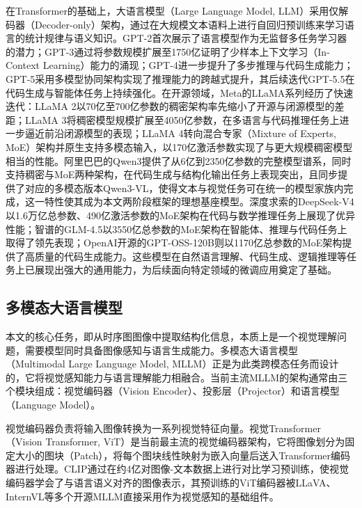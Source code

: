 在Transformer的基础上，大语言模型（Large Language Model, LLM）采用仅解码器（Decoder-only）架构，通过在大规模文本语料上进行自回归预训练来学习语言的统计规律与语义知识。GPT-2首次展示了语言模型作为无监督多任务学习器的潜力；GPT-3通过将参数规模扩展至1750亿证明了少样本上下文学习（In-Context Learning）能力的涌现；GPT-4进一步提升了多步推理与代码生成能力；GPT-5采用多模型协同架构实现了推理能力的跨越式提升，其后续迭代GPT-5.5在代码生成与智能体任务上持续强化。在开源领域，Meta的LLaMA系列经历了快速迭代：LLaMA 2以70亿至700亿参数的稠密架构率先缩小了开源与闭源模型的差距；LLaMA 3将稠密模型规模扩展至4050亿参数，在多语言与代码推理任务上进一步逼近前沿闭源模型的表现；LLaMA 4转向混合专家（Mixture of Experts, MoE）架构并原生支持多模态输入，以170亿激活参数实现了与更大规模稠密模型相当的性能。阿里巴巴的Qwen3提供了从6亿到2350亿参数的完整模型谱系，同时支持稠密与MoE两种架构，在代码生成与结构化输出任务上表现突出，且同步提供了对应的多模态版本Qwen3-VL，使得文本与视觉任务可在统一的模型家族内完成，这一特性使其成为本文两阶段框架的理想基座模型。深度求索的DeepSeek-V4以1.6万亿总参数、490亿激活参数的MoE架构在代码与数学推理任务上展现了优异性能；智谱的GLM-4.5以3550亿总参数的MoE架构在智能体、推理与代码任务上取得了领先表现；OpenAI开源的GPT-OSS-120B则以1170亿总参数的MoE架构提供了高质量的代码生成能力。这些模型在自然语言理解、代码生成、逻辑推理等任务上已展现出强大的通用能力，为后续面向特定领域的微调应用奠定了基础。


\subsection{多模态大语言模型}

本文的核心任务，即从时序图图像中提取结构化信息，本质上是一个视觉理解问题，需要模型同时具备图像感知与语言生成能力。多模态大语言模型（Multimodal Large Language Model, MLLM）正是为此类跨模态任务而设计的，它将视觉感知能力与语言理解能力相融合。当前主流MLLM的架构通常由三个模块组成：视觉编码器（Vision Encoder）、投影层（Projector）和语言模型（Language Model）。

视觉编码器负责将输入图像转换为一系列视觉特征向量。视觉Transformer（Vision Transformer, ViT）是当前最主流的视觉编码器架构，它将图像划分为固定大小的图块（Patch），将每个图块线性映射为嵌入向量后送入Transformer编码器进行处理。CLIP通过在约4亿对图像-文本数据上进行对比学习预训练，使视觉编码器学会了与语言语义对齐的图像表示，其预训练的ViT编码器被LLaVA、InternVL等多个开源MLLM直接采用作为视觉感知的基础组件。

